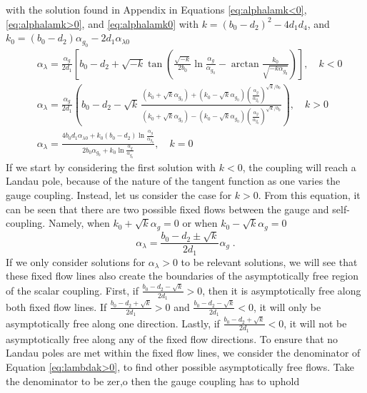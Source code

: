 with the solution found in Appendix in Equations \ref{eq:alphalamk<0}, \ref{eq:alphalamk>0}, and \ref{eq:alphalamk0} with $k = (b_0 - d_2)^2 - 4d_1 d_4$, and $k_0 = (b_0 - d_2)\alpha_{g_0} - 2d_1\alpha_{\lambda0}$
\begin{align}
    &\alpha_{\lambda} = \frac{\alpha_{g}}{2d_{1}} \left[ b_0 - d_2 + \sqrt{-k} \tan\left( \frac{\sqrt{-k}}{2b_0} \ln\frac{\alpha_g}{\alpha_{g_0}} - \arctan\frac{k_0}{\sqrt{-k\alpha_{g_0}}} \right) \right] , \quad k<0 \\&
    \alpha_{\lambda} = \frac{\alpha_g}{2d_1} \left( b_0 - d_2 - \sqrt{k} \, \frac{ (k_0 + \sqrt{k}\alpha_{g_0}) + (k_0 - \sqrt{k}\alpha_{g_0}) \left( \frac{\alpha_g}{\alpha_{g_0}} \right)^{\sqrt{k}/b_0} }{ (k_0 + \sqrt{k}\alpha_{g_0}) - (k_0 - \sqrt{k}\alpha_{g_0}) \left( \frac{\alpha_g}{\alpha_{g_0}} \right)^{\sqrt{k}/b_0} } \right) , \quad k>0 \label{eq:lambdak>0}\\&
    \alpha_{\lambda} = \frac{ 4b_0 d_1 \alpha_{\lambda0} + k_0 (b_0 - d_2) \ln\frac{\alpha_g}{\alpha_{g_0}} }{ 2b_0 \alpha_{g_0} + k_0 \ln\frac{\alpha_g}{\alpha_{g_0}} } , \quad k=0 \label{eq:lambdak0}
\end{align}
If we start by considering the first solution with $k<0$, the coupling will reach a Landau pole, because of the nature of the tangent function as one varies the gauge coupling. Instead, let us consider the case for $k>0$. From this equation, it can be seen that there are two possible fixed flows between the gauge and self-coupling. Namely, when $k_0+\sqrt{k}\alpha_g=0$ or when $k_0-\sqrt{k}\alpha_g=0$
\begin{equation}
    \alpha_\lambda =\frac{b_0-d_2\pm\sqrt{k}}{2d_1}\alpha_g\;.\label{eq:lamgfixed}
\end{equation}
If we only consider solutions for $\alpha_\lambda>0$ to be relevant solutions, we will see that these fixed flow lines also create the boundaries of the asymptotically free region of the scalar coupling. First, if $\frac{b_0-d_2-\sqrt{k}}{2d_1}>0$, then it is asymptotically free along both fixed flow lines. If $\frac{b_0-d_2+\sqrt{k}}{2d_1}>0$ and $\frac{b_0-d_2-\sqrt{k}}{2d_1}<0$, it will only be asymptotically free along one direction. Lastly, if $\frac{b_0-d_2+\sqrt{k}}{2d_1}<0$, it will not be asymptotically free along any of the fixed flow directions. To ensure that no Landau poles are met within the fixed flow lines, we consider the denominator of Equation \ref{eq:lambdak>0}, to find other possible asymptotically free flows. Take the denominator to be zer,o then the gauge coupling has to uphold
